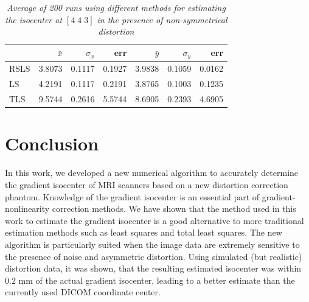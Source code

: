 \begin{table}
  \begin{tabular} {| l | r | r | r | r | r | r |}
    \hline
    & $\bar{x}$ & $\sigma_x$ & err & $\bar{y}$ & $\sigma_y$ & err \\
    \hline
    RSLS & 3.8073 & 0.1117 & 0.1927   & 3.9838 & 0.1059 & 0.0162 \\
    \hline
    LS  & 4.2191 & 0.1117    & 0.2191 & 3.8765 & 0.1003 & 0.1235 \\
    \hline
    TLS  & 9.5744 & 0.2616 & 5.5744   & 8.6905 & 0.2393 & 4.6905 \\
    \hline
  \end{tabular}
  \caption{\emph{Average of 200 runs using different methods for estimating the isocenter at $[4 \; 4 \; 3]$ in the presence of non-symmetrical distortion }} \label{table:nonsymmetric}
\end{table}


\section{Conclusion}
In this work, we developed a new numerical algorithm to accurately determine the gradient isocenter
of MRI scanners based on a new distortion correction phantom. Knowledge of the gradient isocenter is an essential part of gradient-nonlinearity correction methods.  We have shown that the method used in this work to estimate the gradient isocenter is a good alternative to more traditional estimation methods such as least squares and total least squares. The new algorithm is particularly suited when the image data are extremely sensitive to the presence of noise and asymmetric distortion. Using simulated (but realistic) distortion data, it was shown, that the resulting estimated isocenter was within $0.2$ mm of the actual gradient isocenter, leading to a better estimate than the currently used DICOM coordinate center.
